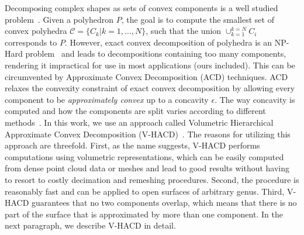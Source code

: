 Decomposing complex shapes as sets of convex components is a well studied problem~\cite{acd,vhacd,acanalysis,minimumncd}.
Given a polyhedron $P$, the goal is to compute the smallest set of convex polyhedra $\mathcal{C} = \{C_k | k=1,...,N\}$, 
such that the union $\cup_{k=1}^{k=N}C_i$ corresponds to $P$.
However, exact convex decomposition of polyhedra is an NP-Hard problem~\cite{ecd} and 
leads to decompositions containing too many components, rendering it impractical for use
in most applications (ours included).
This can be circumvented by Approximate Convex Decomposition (ACD) techniques.
ACD relaxes the convexity constraint of exact convex decomposition by allowing every
component to be \emph{approximately convex} up to a concavity $\epsilon$.
The way concavity is computed and how the components are split varies according to different 
methods~\cite{vhacd,fastacd,acd,acanalysis,minimumncd}.
In this work, we use an approach called Volumetric Hierarchical Approximate Convex Decomposition (V-HACD)~\cite{vhacd}.
The reasons for utilizing this approach are threefold.
First, as the name suggests, V-HACD performs computations using volumetric representations, which can be easily
computed from dense point cloud data or meshes and lead to good results
without having to resort to costly decimation and remeshing procedures.
Second, the procedure is reasonably fast and can be applied to open surfaces of arbitrary genus.
Third, V-HACD guarantees that no two components overlap, which means that there is no
part of the surface that is approximated by more than one component.
In the next paragraph, we describe V-HACD in detail.

